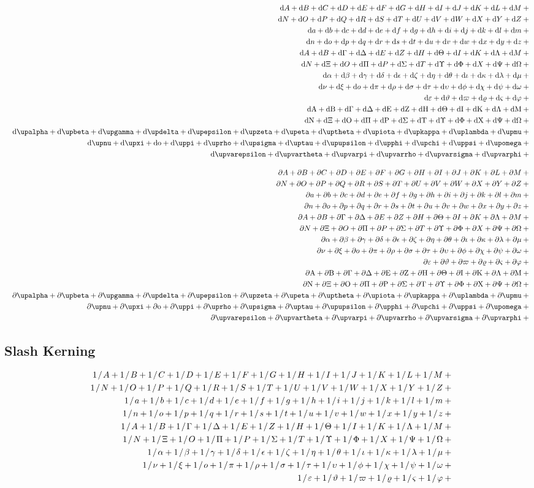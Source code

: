 	\begin{eqnarray*}
	\gdef\test#1{\dd #1+{}}%
	  && {\testupperi}\\
	  && {\testupperii}\\
	  && {\testloweri}\\
	  && {\testlowerii}\\
	  && {\testupgreeki}\\
	  && {\testupgreekii}\\
	  && {\testlowgreeki}\\
	  && {\testlowgreekii}\\
	  && {\testlowgreekiii}\\
	\gdef\test#1{\dd \mathrm{#1}+{}}%
	  && {\testupgreeki}\\
	  && {\testupgreekii}\\
	  && {\testlowgreekupi}\\
	  && {\testlowgreekupii}\\
	  && {\testlowgreekupiii}\\
	\end{eqnarray*}%

	\begin{eqnarray*}
	\gdef\test#1{\partial #1+{}}%
	  && {\testupperi}\\
	  && {\testupperii}\\
	  && {\testloweri}\\
	  && {\testlowerii}\\
	  && {\testupgreeki}\\
	  && {\testupgreekii}\\
	  && {\testlowgreeki}\\
	  && {\testlowgreekii}\\
	  && {\testlowgreekiii}\\
	\gdef\test#1{\partial \mathrm{#1}+{}}%
	  && {\testupgreeki}\\
	  && {\testupgreekii}\\
	  && {\testlowgreekupi}\\
	  && {\testlowgreekupii}\\
	  && {\testlowgreekupiii}\\
	\end{eqnarray*}%

	\subsection{Slash Kerning \showfamily}

	\def\test#1{1 \divslash #1+{}}
	\begin{eqnarray*}
	  && {\testupperi}\\
	  && {\testupperii}\\
	  && {\testloweri}\\
	  && {\testlowerii}\\
	  && {\testupgreeki}\\
	  && {\testupgreekii}\\
	  && {\testlowgreeki}\\
	  && {\testlowgreekii}\\
	  && {\testlowgreekiii}
	\end{eqnarray*}

